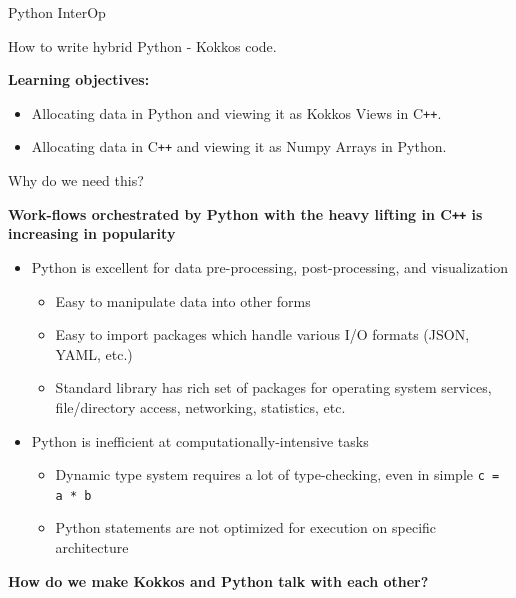 


\begin{frame}[fragile]

  {\Huge Python InterOp}

  \vspace{10pt}

  {\large How to write hybrid Python - Kokkos code.}

  \vspace{20pt}

  \textbf{Learning objectives:}
  \begin{itemize}
    \item {Allocating data in Python and viewing it as Kokkos Views in C\texttt{++}.}
    \item {Allocating data in C\texttt{++} and viewing it as Numpy Arrays in Python.}
  \end{itemize}

  \vspace{-20pt}

\end{frame}


\begin{frame}[fragile]{Why do we need this?}

\textbf{Work-flows orchestrated by Python with the heavy lifting in C\texttt{++} is increasing in popularity}

\begin{itemize}
  \item Python is excellent for data pre-processing, post-processing, and visualization
  \begin{itemize}
    \item Easy to manipulate data into other forms
    \item Easy to import packages which handle various I/O formats (JSON, YAML, etc.)
    \item Standard library has rich set of packages for operating system services, 
    file/directory access, networking, statistics, etc.
  \end{itemize}
  \item Python is inefficient at computationally-intensive tasks
  \begin{itemize}
    \item Dynamic type system requires a lot of type-checking, even in simple \lstinline|c = a * b|
    \item Python statements are not optimized for execution on specific architecture
  \end{itemize}
\end{itemize}

\pause
\textbf{How do we make Kokkos and Python talk with each other?}
\end{frame}

